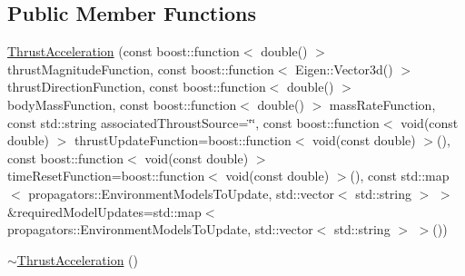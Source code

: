 \subsection*{Public Member Functions}
\begin{DoxyCompactItemize}
\item 
\hyperlink{classtudat_1_1propulsion_1_1ThrustAcceleration_a0f1bf2418aab0ea328cbff7be6e1f64c}{Thrust\+Acceleration} (const boost\+::function$<$ double() $>$ thrust\+Magnitude\+Function, const boost\+::function$<$ Eigen\+::\+Vector3d() $>$ thrust\+Direction\+Function, const boost\+::function$<$ double() $>$ body\+Mass\+Function, const boost\+::function$<$ double() $>$ mass\+Rate\+Function, const std\+::string associated\+Throust\+Source=\char`\"{}\char`\"{}, const boost\+::function$<$ void(const double) $>$ thrust\+Update\+Function=boost\+::function$<$ void(const double) $>$(), const boost\+::function$<$ void(const double) $>$ time\+Reset\+Function=boost\+::function$<$ void(const double) $>$(), const std\+::map$<$ propagators\+::\+Environment\+Models\+To\+Update, std\+::vector$<$ std\+::string $>$ $>$ \&required\+Model\+Updates=std\+::map$<$ propagators\+::\+Environment\+Models\+To\+Update, std\+::vector$<$ std\+::string $>$ $>$())
\item 
\hyperlink{classtudat_1_1propulsion_1_1ThrustAcceleration_a9106c02d3b2ddda7a6724736d5662ae0}{$\sim$\+Thrust\+Acceleration} ()\hypertarget{classtudat_1_1propulsion_1_1ThrustAcceleration_a9106c02d3b2ddda7a6724736d5662ae0}{}\label{classtudat_1_1propulsion_1_1ThrustAcceleration_a9106c02d3b2ddda7a6724736d5662ae0}


\end{DoxyCompactItemize}
